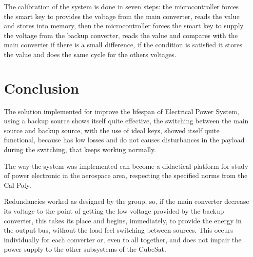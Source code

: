 \documentclass[3p]{elsarticle}
\begin{document}
	The calibration of the system is done in seven steps: the microcontroller forces the smart key to provides the voltage from the main converter, reads the value and stores into memory, then the microcontroller forces the smart key to supply the voltage from the backup converter, reads the value and compares with the main converter if there is a small difference, if the condition is satisfied it stores the value and does the same cycle for the others voltages.

\section{Conclusion}
\label{Conclusion}

	 The solution implemented for improve the lifespan of Electrical Power System, using a backup source shows itself quite effective, the switching between the main source and backup source, with the use of ideal keys, showed itself quite functional, because has low losses and do not causes disturbances in the payload during the switching, that keeps working normally. 
	
	The way the system was implemented can become a didactical platform for study of power electronic in the aerospace area, respecting the specified norms from the Cal Poly.\cite{CubeSat} 

	Redundancies worked as designed by the group, so, if the main converter decrease its voltage to the point of getting the low voltage provided by the backup converter, this takes its place and begins, immediately, to provide the energy in the output bus, without the load feel switching between sources. This occurs individually for each converter or, even to all together, and does not impair the power supply to the other subsystems of the CubeSat.

	
\end{document}
